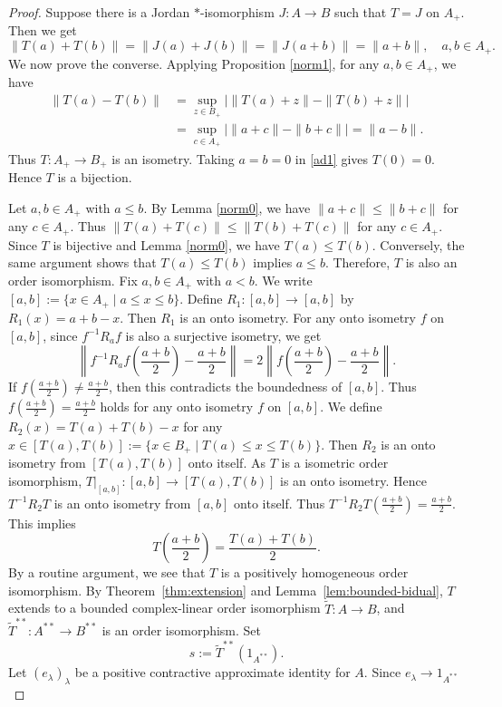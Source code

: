 \documentclass[12pt]{amsart}
\theoremstyle{remark}
\begin{document}
\begin{proof}
Suppose there is a Jordan $*$-isomorphism $J:A \to B$ such that $T=J$ on $A_{+}$. Then we get
\[
 \|T(a)+T(b)\|=\|J(a)+J(b)\|=\|J(a+b)\|=\|a+b\|, \quad a, b \in A_{+}.
\]
We now prove the converse. Applying Proposition \ref{norm1}, for any $a, b \in A_{+}$, we have
\[ \begin{aligned} \|T(a)-T(b)\| &=\sup_{z\in B_+} \bigl|\|T(a)+z\|-\|T(b)+z\|\bigr|\\ &=\sup_{c\in A_+} \bigl|\|a+c\|-\|b+c\|\bigr|=\|a-b\|. \end{aligned}  \]
Thus $T:A_{+} \to B_{+}$ is an isometry. Taking $a=b=0$ in \eqref{ad1} gives $T(0)=0$. Hence $T$ is a bijection.  

Let $a, b \in A_{+}$ with $a \le b$. By Lemma \ref{norm0}, we have $\|a+c\| \le \|b+c\|$ for any $c \in A_{+}$. Thus $\|T(a)+T(c)\|\le \|T(b)+T(c)\|$ for any $c \in A_{+}$. Since $T$ is bijective and Lemma \ref{norm0}, we have $T(a) \le T(b)$. Conversely, the same argument shows that $T(a)\le T(b)$ implies
$a\le b $. Therefore, $T$ is also an order isomorphism. Fix $a, b \in A_{+}$ with $a<b$. We write $[a, b]:=\{ x \in A_{+} \mid a \le x \le b\}$. Define $R_1:[a, b] \to [a, b]$ by $R_1(x)=a+b-x$.  Then $R_1$ is an onto isometry. For any onto isometry $f$ on $[a, b]$, since $f^{-1}R_af$ is also a surjective isometry, we get 
\[
\left\|f^{-1}R_af\left(\frac{a+b}{2}\right)-\frac{a+b}{2}\right\|=2\left\|f\left(\frac{a+b}{2}\right)-\frac{a+b}{2}\right\|.
\]
If $f(\frac{a+b}{2}) \neq \frac{a+b}{2}$, then this contradicts the boundedness of $[a, b]$.  Thus $f\left(\frac{a+b}{2}\right)=\frac{a+b}{2}$ holds for any onto isometry $f$ on $[a, b]$. We define $R_{2}(x)=T(a)+T(b)-x$ for any $x \in [T(a), T(b)]:=\{x \in B_{+} \mid T(a) \le x \le T(b)\}$. Then $R_2$ is an onto isometry from $[T(a), T(b)]$ onto itself. As $T$ is a isometric order isomorphism, $T|_{[a,b]}: [a,b] \to [T(a), T(b)]$ is an onto isometry. Hence $T^{-1}R_2T$ is an onto isometry from $[a,b]$ onto itself.  Thus $T^{-1}R_{2}T\left(\frac{a+b}{2}\right)=\frac{a+b}{2}$. This implies
\[
T\!\left(\frac{a+b}{2}\right) =\frac{T(a)+T(b)}2.
\]
By a routine argument, we see that $T$ is a positively homogeneous
order isomorphism.
By Theorem~\ref{thm:extension} and
Lemma~\ref{lem:bounded-bidual}, $T$ extends to a bounded
complex-linear order isomorphism
$\widetilde T:A\to B$, and
$\widetilde T^{**}:A^{**}\to B^{**}$ is an order isomorphism.
Set
\[
    s:=\widetilde T^{**}(1_{A^{**}}).
\]
Let $(e_\lambda)_\lambda$ be a positive
contractive approximate identity for $A$. Since $e_\lambda \to 1_{A^{**}}$

\end{proof}
\end{document}
